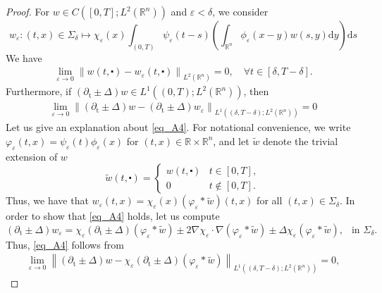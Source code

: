 \documentclass[10pt,a4paper]{amsart}
\theoremstyle{remark}
\theoremstyle{definition}
\begin{document}
\begin{proof}
For $w \in C\left([0, T] ; L^2\left(\mathbb{R}^n\right)\right)$ and $\varepsilon<\delta$, we consider
$$
w_{\varepsilon}:(t, x) \in \Sigma_\delta \mapsto \chi_{\varepsilon}(x) \int_{(0, T)} \psi_{\varepsilon}(t-s)\left(\int_{\mathbb{R}^n} \phi_{\varepsilon}(x-y) w(s, y) \mathrm{d} y\right) \mathrm{d} s
$$
We have
\begin{align}\label{eq_A3}
  \lim _{\varepsilon \rightarrow 0}\left\|w(t, \centerdot)-w_{\varepsilon}(t, \centerdot)\right\|_{L^2\left(\mathbb{R}^n\right)}=0, \quad \forall t \in[\delta, T-\delta] .  
\end{align}
Furthermore, if $\left(\partial_{\mathrm{t}}\pm\Delta\right) w \in L^1\left((0, T) ; L^2\left(\mathbb{R}^n\right)\right)$, then
\begin{align}\label{eq_A4}
  \lim _{\varepsilon \rightarrow 0}\left\|\left( \partial_{\mathrm{t}} \pm \Delta\right) w-\left( \partial_{\mathrm{t}} \pm \Delta\right) w_{\varepsilon}\right\|_{L^1\left((\delta, T-\delta) ; L^2\left(\mathbb{R}^n\right)\right)}=0  
\end{align}
Let us give an explanation about \eqref{eq_A4}. For notational convenience, we write $\varphi_{\varepsilon}(t, x)=\psi_{\varepsilon}(t) \phi_{\varepsilon}(x)$ for $(t, x) \in \mathbb{R} \times \mathbb{R}^n$, and let $\tilde{w}$ denote the trivial extension of $w$
$$
\tilde{w}(t, \centerdot)= \begin{cases}w(t, \centerdot) & t \in[0, T], \\ 0 & t \notin[0, T] .\end{cases}
$$
Thus, we have that $w_{\varepsilon}(t, x)=\chi_{\varepsilon}(x)\left(\varphi_{\varepsilon} * \tilde{w}\right)(t, x)$ for all $(t, x) \in \Sigma_\delta$. In order to show that \eqref{eq_A4} holds, let us compute
$$
\left(\partial_{\mathrm{t}} \pm \Delta\right) w_{\varepsilon}=\chi_{\varepsilon}\left( \partial_{\mathrm{t}} \pm \Delta\right)\left(\varphi_{\varepsilon} * \tilde{w}\right) \pm 2 \nabla \chi_{\varepsilon} \cdot \nabla\left(\varphi_{\varepsilon} * \tilde{w}\right) \pm \Delta \chi_{\varepsilon}\left(\varphi_{\varepsilon} * \tilde{w}\right),~~ \text { in } \Sigma_\delta .
$$
Thus, \eqref{eq_A4} follows from
\begin{align}
 \lim _{\varepsilon \rightarrow 0}\left\|\left( \partial_{\mathrm{t}}\pm\Delta\right) w-\chi_{\varepsilon}\left( \partial_{\mathrm{t}}\pm\Delta\right)\left(\varphi_{\varepsilon} \ast \tilde{w}\right)\right\|_{L^1\left((\delta, T-\delta) ; L^2\left(\mathbb{R}^n\right)\right)}=0,  \label{eq_A5} 
\end{align}

\end{proof}
\end{document}
